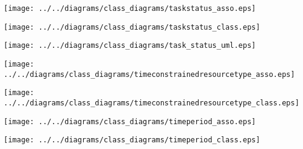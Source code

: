     \begin{frame}
    \begin{center}
    \texttt{[image: ../../diagrams/class\_diagrams/taskstatus\_asso.eps]}
    \end{center}
    \end{frame}
    

    \begin{frame}
    \begin{center}
    \texttt{[image: ../../diagrams/class\_diagrams/taskstatus\_class.eps]}
    \end{center}
    \end{frame}
    

    \begin{frame}
    \begin{center}
    \texttt{[image: ../../diagrams/class\_diagrams/task\_status\_uml.eps]}
    \end{center}
    \end{frame}
    

    \begin{frame}
    \begin{center}
    \texttt{[image: ../../diagrams/class\_diagrams/timeconstrainedresourcetype\_asso.eps]}
    \end{center}
    \end{frame}
    

    \begin{frame}
    \begin{center}
    \texttt{[image: ../../diagrams/class\_diagrams/timeconstrainedresourcetype\_class.eps]}
    \end{center}
    \end{frame}
    

    \begin{frame}
    \begin{center}
    \texttt{[image: ../../diagrams/class\_diagrams/timeperiod\_asso.eps]}
    \end{center}
    \end{frame}
    

    \begin{frame}
    \begin{center}
    \texttt{[image: ../../diagrams/class\_diagrams/timeperiod\_class.eps]}
    \end{center}
    \end{frame}
    

